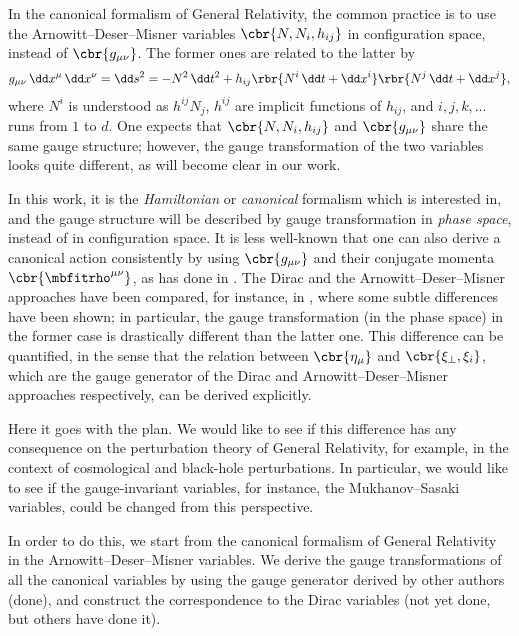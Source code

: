 \documentclass[a4paper,11pt]{article}
\begin{document}
In the canonical formalism of General Relativity, the common practice is to use 
the Arnowitt--Deser--Misner variables $\cbr{N, N_i, h_{ij}}$ in configuration 
space, instead of $\cbr{g_{\mu\nu}}$. The former ones are related to the latter 
by
\begin{align}
g_{\mu\nu}\,\dd x^\mu\,\dd x^\nu = \dd s^2 = -N^2\,\dd t^2 + h_{ij}
\rbr{N^i\,\dd t + \dd x^i}\rbr{N^j\,\dd t + \dd x^j},
\label{eq:metric-Dirac-ADM}
\end{align}
where $N^i$ is understood as $h^{ij}N_j$, $h^{ij}$ are implicit functions 
of $h_{ij}$, and $i, j, k, \ldots$ runs from $1$ to $d$. One expects that 
$\cbr{N, N_i, h_{ij}}$ and $\cbr{g_{\mu\nu}}$ share the same gauge structure; 
however, the gauge transformation of the two variables looks quite different, 
as will become clear in our work.

In this work, it is the \emph{Hamiltonian} or \emph{canonical} formalism which 
is interested in, and the gauge structure will be described by gauge 
transformation in \emph{phase space}, instead of in configuration space. It is 
less well-known that one can also derive a canonical action consistently by 
using $\cbr{g_{\mu\nu}}$ and their conjugate momenta $\cbr{\mbfitrho^{\mu\nu}}$, 
as \citeauthor{Dirac1958} has done in \cite{Dirac1958}. The Dirac and the 
Arnowitt--Deser--Misner approaches have been compared, for instance, in
\cite{Kiriushcheva2008}, where some subtle differences have been shown; in 
particular, the gauge transformation (in the phase space) in the former case 
is drastically different than the latter one.
This difference can be quantified, in the sense that the relation between 
$\cbr{\eta_\mu}$ and $\cbr{\xi_\perp, \xi_i}$, which are the gauge generator of 
the Dirac and Arnowitt--Deser--Misner approaches respectively, can be derived 
explicitly.

Here it goes with the plan. We would like to see if this difference has any 
consequence on the perturbation theory of General Relativity, for example, in 
the context of cosmological and black-hole perturbations. In particular, we 
would like to see if the gauge-invariant variables, for instance, the 
Mukhanov--Sasaki variables, could be changed from this perspective.

In order to do this, we start from the canonical formalism of General 
Relativity in the Arnowitt--Deser--Misner variables. We derive the gauge 
transformations of all the canonical variables by using the gauge generator 
derived by other authors (done), and construct the correspondence to the Dirac 
variables (not yet done, but others have done it).
\end{document}
